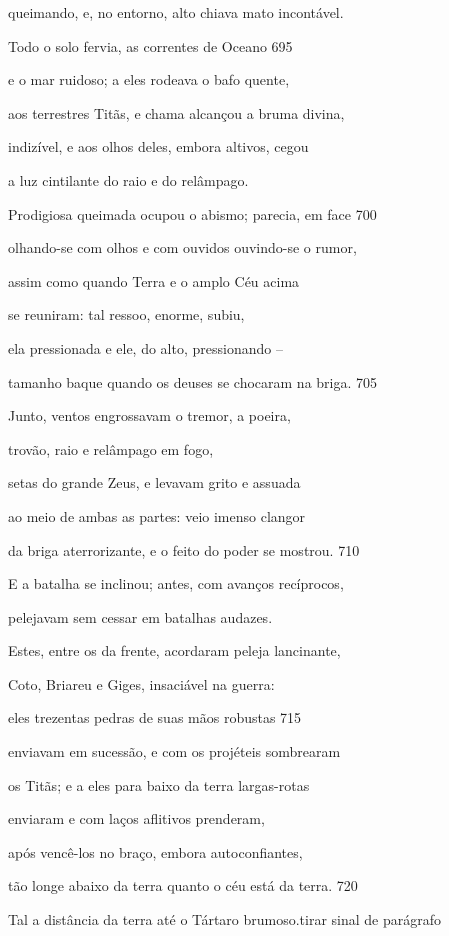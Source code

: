 queimando, e, no entorno, alto chiava mato incontável.

Todo o solo fervia, as correntes de Oceano \num{695}

e o mar ruidoso; a eles rodeava o bafo quente,

aos terrestres Titãs, e chama alcançou a bruma divina,

indizível, e aos olhos deles, embora altivos, cegou

a luz cintilante do raio e do relâmpago.

Prodigiosa queimada ocupou o abismo; parecia, em face \num{700}

olhando-se com olhos e com ouvidos ouvindo-se o rumor,

assim como quando Terra e o amplo Céu acima

se reuniram: tal ressoo, enorme, subiu,

ela pressionada e ele, do alto, pressionando --

tamanho baque quando os deuses se chocaram na briga. \num{705}

Junto, ventos engrossavam o tremor, a poeira,

trovão, raio e relâmpago em fogo,

setas do grande Zeus, e levavam grito e assuada

ao meio de ambas as partes: veio imenso clangor

da briga aterrorizante, e o feito do poder se mostrou. \num{710}

\quad{}E a batalha se inclinou; antes, com avanços recíprocos,

pelejavam sem cessar em batalhas audazes.

Estes, entre os da frente, acordaram peleja lancinante,

Coto, Briareu e Giges, insaciável na guerra:

eles trezentas pedras de suas mãos robustas \num{715}

enviavam em sucessão, e com os projéteis sombrearam

os Titãs; e a eles para baixo da terra largas-rotas

enviaram e com laços aflitivos prenderam,

após vencê-los no braço, embora autoconfiantes,

tão longe abaixo da terra quanto o céu está da terra. \num{720}

\medskip

Tal a distância da terra até o Tártaro brumoso.tirar sinal de parágrafo

